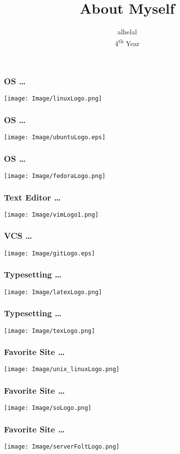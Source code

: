 \documentclass{beamer}
\title{About Myself}
\author{alhelal\\4\textsuperscript{th} Year}
\institute{CSEDU}
\begin{document}
\maketitle
\begin{frame}
  \frametitle{OS \ldots}
  \begin{center}
    \texttt{[image: Image/linuxLogo.png]}
  \end{center}
\end{frame}
\begin{frame}
  \frametitle{OS \ldots}
  \begin{center}
    \texttt{[image: Image/ubuntuLogo.eps]}
  \end{center}
\end{frame}
\begin{frame}
  \frametitle{OS \ldots}
  \begin{center}
    \texttt{[image: Image/fedoraLogo.png]}
  \end{center}
\end{frame}
\begin{frame}
  \frametitle{Text Editor \ldots}
  \begin{center}
    \texttt{[image: Image/vimLogo1.png]}
  \end{center}
\end{frame}
\begin{frame}
  \frametitle{VCS \ldots}
  \begin{center}
    \texttt{[image: Image/gitLogo.eps]}
  \end{center}
\end{frame}
\begin{frame}
  \frametitle{Typesetting \ldots}
  \begin{center}
    \texttt{[image: Image/latexLogo.png]}
  \end{center}
\end{frame}
\begin{frame}
  \frametitle{Typesetting \ldots}
  \begin{center}
    \texttt{[image: Image/texLogo.png]}
  \end{center}
\end{frame}
\begin{frame}
  \frametitle{Favorite Site \ldots}
  \begin{center}
    \texttt{[image: Image/unix\_linuxLogo.png]}
  \end{center}
\end{frame}
\begin{frame}
  \frametitle{Favorite Site \ldots}
  \begin{center}
    \texttt{[image: Image/soLogo.png]}
  \end{center}
\end{frame}
\begin{frame}
  \frametitle{Favorite Site \ldots}
  \begin{center}
    \texttt{[image: Image/serverFoltLogo.png]}
  \end{center}
\end{frame}
\end{document}
